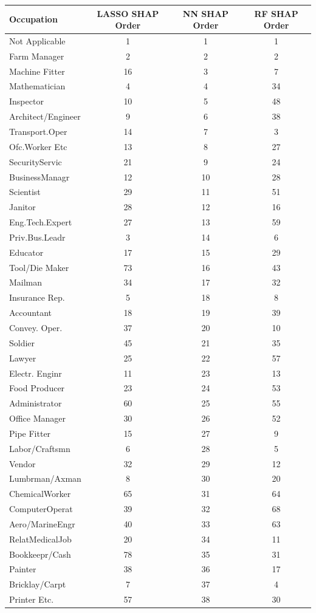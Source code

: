 \begin{tabular}{lccc}
\hline\hline
Occupation & LASSO SHAP Order & NN SHAP Order & RF SHAP Order \\
\hline
Not Applicable&1&1&1\\
Farm Manager&2&2&2\\
Machine Fitter&16&3&7\\
Mathematician&4&4&34\\
Inspector&10&5&48\\
Architect/Engineer&9&6&38\\
Transport.Oper&14&7&3\\
Ofc.Worker Etc&13&8&27\\
SecurityServic&21&9&24\\
BusinessManagr&12&10&28\\
Scientist&29&11&51\\
Janitor&28&12&16\\
Eng.Tech.Expert&27&13&59\\
Priv.Bus.Leadr&3&14&6\\
Educator&17&15&29\\
Tool/Die Maker&73&16&43\\
Mailman&34&17&32\\
Insurance Rep.&5&18&8\\
Accountant&18&19&39\\
Convey. Oper.&37&20&10\\
Soldier&45&21&35\\
Lawyer&25&22&57\\
Electr. Enginr&11&23&13\\
Food Producer&23&24&53\\
Administrator&60&25&55\\
Office Manager&30&26&52\\
Pipe Fitter&15&27&9\\
Labor/Craftsmn&6&28&5\\
Vendor&32&29&12\\
Lumbrman/Axman&8&30&20\\
ChemicalWorker&65&31&64\\
ComputerOperat&39&32&68\\
Aero/MarineEngr&40&33&63\\
RelatMedicalJob&20&34&11\\
Bookkeepr/Cash&78&35&31\\
Painter&38&36&17\\
Bricklay/Carpt&7&37&4\\
Printer Etc.&57&38&30\\

\end{tabular}

